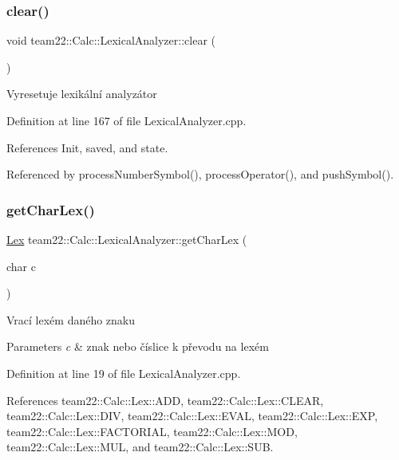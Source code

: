 \subsubsection{\texorpdfstring{clear()}{clear()}}
{\footnotesize\ttfamily void team22\+::\+Calc\+::\+Lexical\+Analyzer\+::clear (\begin{DoxyParamCaption}{ }\end{DoxyParamCaption})}

Vyresetuje lexikální analyzátor 

Definition at line 167 of file Lexical\+Analyzer.\+cpp.



References Init, saved, and state.



Referenced by process\+Number\+Symbol(), process\+Operator(), and push\+Symbol().

\mbox{\label{classteam22_1_1_calc_1_1_lexical_analyzer_a451aa3e3ed6f150d5b24fae76cc93cb4}} 
\subsubsection{\texorpdfstring{get\+Char\+Lex()}{getCharLex()}}
{\footnotesize\ttfamily \hyperlink{classteam22_1_1_calc_1_1_lex}{Lex} team22\+::\+Calc\+::\+Lexical\+Analyzer\+::get\+Char\+Lex (\begin{DoxyParamCaption}\item[{char}]{c }\end{DoxyParamCaption})\hspace{0.3cm}{\ttfamily [private]}}

Vrací lexém daného znaku 
\begin{DoxyParams}{Parameters}
{\em c} & znak nebo číslice k převodu na lexém \\
\hline
\end{DoxyParams}


Definition at line 19 of file Lexical\+Analyzer.\+cpp.



References team22\+::\+Calc\+::\+Lex\+::\+A\+DD, team22\+::\+Calc\+::\+Lex\+::\+C\+L\+E\+AR, team22\+::\+Calc\+::\+Lex\+::\+D\+IV, team22\+::\+Calc\+::\+Lex\+::\+E\+V\+AL, team22\+::\+Calc\+::\+Lex\+::\+E\+XP, team22\+::\+Calc\+::\+Lex\+::\+F\+A\+C\+T\+O\+R\+I\+AL, team22\+::\+Calc\+::\+Lex\+::\+M\+OD, team22\+::\+Calc\+::\+Lex\+::\+M\+UL, and team22\+::\+Calc\+::\+Lex\+::\+S\+UB.




